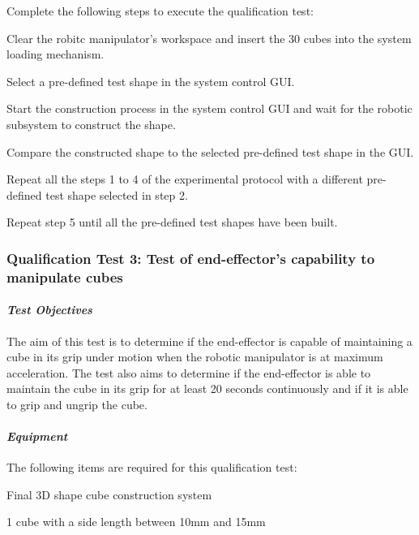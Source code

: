 Complete the following steps to execute the qualification test:

\begin{compactenum}
    \item Clear the robitc manipulator's workspace and insert the 30 cubes into the system loading mechanism.
    \item Select a pre-defined test shape in the system control GUI.
    \item Start the construction process in the system control GUI and wait for the robotic subsystem to construct the shape.
    \item Compare the constructed shape to the selected pre-defined test shape in the GUI.
    \item Repeat all the steps 1 to 4 of the experimental protocol with a different pre-defined test shape selected in step 2. 
    \item Repeat step 5 until all the pre-defined test shapes have been built.
\end{compactenum}

\subsubsection*{Qualification Test 3: Test of end-effector's capability to manipulate cubes}

\paragraph{\textit{Test Objectives}}

The aim of this test is to determine if the end-effector is capable of maintaining a cube in its grip under motion when the robotic manipulator is at maximum acceleration. The test also aims to determine if the end-effector is able to maintain the cube in its grip for at least 20 seconds continuously and if it is able to grip and ungrip the cube.

\paragraph{\textit{Equipment}}

The following items are required for this qualification test:

\begin{compactitem}
    \item Final 3D shape cube construction system
    \item 1 cube with a side length between 10mm and 15mm
\end{compactitem}

